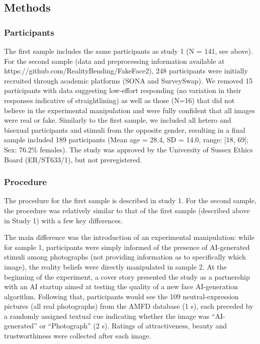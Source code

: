 \documentclass[
  jou,
  floatsintext,
  longtable,
  nolmodern,
  notxfonts,
  notimes,
  colorlinks=true,linkcolor=blue,citecolor=blue,urlcolor=blue]{apa7}
\begin{document}
\subsection{Methods}\label{methods-1}

\subsubsection{Participants}\label{participants-1}

The first sample includes the same participants as study 1 (N = 141, see
above). For the second sample (data and preprocessing information
available at https://github.com/RealityBending/FakeFace2), 248
participants were initially recruited through academic platforms (SONA
and SurveySwap). We removed 15 participants with data suggesting
low-effort responding (no variation in their responses indicative of
straightlining) as well as those (N=16) that did not believe in the
experimental manipulation and were fully confident that all images were
real or fake. Similarly to the first sample, we included all hetero and
bisexual participants and stimuli from the opposite gender, resulting in
a final sample included 189 participants (Mean age = 28.4, SD = 14.0,
range: {[}18, 69{]}; Sex: 76.2\% females). The study was approved by the
University of Sussex Ethics Board (ER/ST633/1), but not preregistered.

\subsubsection{Procedure}\label{procedure-1}

The procedure for the first sample is described in study 1. For the
second sample, the procedure was relatively similar to that of the first
sample (described above in Study 1) with a few key differences.

The main difference was the introduction of an experimental
manipulation: while for sample 1, participants were simply informed of
the presence of AI-generated stimuli among photographs (not providing
information as to specifically which image), the reality beliefs were
directly manipulated in sample 2. At the beginning of the experiment, a
cover story presented the study as a partnership with an AI startup
aimed at testing the quality of a new face AI-generation algorithm.
Following that, participants would see the 109 neutral-expression
pictures (all real photographs) from the AMFD database (1 s), each
preceded by a randomly assigned textual cue indicating whether the image
was ``AI-generated'' or ``Photograph'' (2 s). Ratings of attractiveness,
beauty and trustworthiness were collected after each image.
\end{document}
